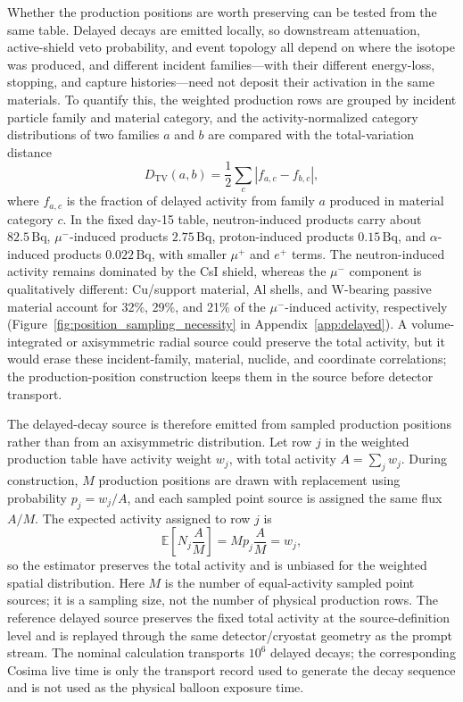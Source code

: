 \documentclass[pdflatex,sn-mathphys-num]{sn-jnl}
\begin{document}
Whether the production positions are worth preserving can be tested from the
same table. Delayed decays are emitted locally, so downstream attenuation,
active-shield veto probability, and event topology all depend on where the
isotope was produced, and different incident families---with their different
energy-loss, stopping, and capture histories---need not deposit their
activation in the same materials. To quantify this, the weighted production
rows are grouped by incident particle family and material category, and the
activity-normalized category distributions of two families $a$ and $b$ are
compared with the total-variation distance
\begin{equation}
  D_{\mathrm{TV}}(a,b) =
  \frac{1}{2}\sum_c \left| f_{a,c} - f_{b,c} \right| ,
\end{equation}
where $f_{a,c}$ is the fraction of delayed activity from family $a$ produced
in material category $c$. In the fixed day-15 table, neutron-induced products
carry about $82.5\,\mathrm{Bq}$, $\mu^-$-induced products $2.75\,\mathrm{Bq}$,
proton-induced products $0.15\,\mathrm{Bq}$, and $\alpha$-induced products
$0.022\,\mathrm{Bq}$, with smaller $\mu^+$ and $e^+$ terms. The
neutron-induced activity remains dominated by the CsI shield, whereas the
$\mu^-$ component is qualitatively different: Cu/support material, Al shells,
and W-bearing passive material account for 32\%, 29\%, and 21\% of the
$\mu^-$-induced activity, respectively
(Figure~\ref{fig:position_sampling_necessity} in Appendix~\ref{app:delayed}).
A volume-integrated or axisymmetric radial source could preserve the total
activity, but it would erase these incident-family, material, nuclide, and
coordinate correlations; the production-position construction keeps them in
the source before detector transport.

The delayed-decay source is therefore emitted from sampled production positions
rather than from an axisymmetric distribution. Let row $j$ in the weighted
production table have activity weight $w_j$, with total activity
$A=\sum_j w_j$. During construction, $M$ production positions are drawn with
replacement using probability $p_j=w_j/A$, and each sampled point source is
assigned the same flux $A/M$. The expected activity assigned to row $j$ is
\begin{equation}
  \mathbb{E}\!\left[N_j\frac{A}{M}\right] = M p_j \frac{A}{M} = w_j ,
\end{equation}
so the estimator preserves the total activity and is unbiased for the weighted
spatial distribution. Here $M$ is the number of equal-activity sampled point
sources; it is a sampling size, not the number of physical production rows. The
reference delayed source preserves the fixed total activity at the
source-definition level and is replayed through the same detector/cryostat
geometry as the prompt stream. The nominal calculation transports $10^6$
delayed decays; the corresponding Cosima live time is only the transport record
used to generate the decay sequence and is not used as the physical balloon
exposure time.
\end{document}
